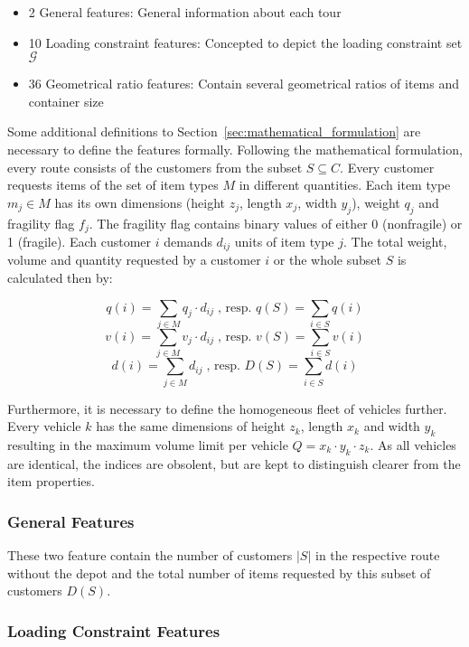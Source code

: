 \begin{itemize}
    \item 2 General features: General information about each tour
    \item 10 Loading constraint features: Concepted to depict the loading constraint set $\mathcal{G}$
    \item 36 Geometrical ratio features: Contain several geometrical ratios of items and container size
\end{itemize}

Some additional definitions to Section~\ref{sec:mathematical_formulation}
are necessary to define the features formally. Following the mathematical formulation, every route consists of the customers
from the subset $S \subseteq C$. Every customer requests items of the set of item types $M$ in different quantities.
Each item type $m_j\in M$ has its own dimensions (height $z_j$, length $x_j$, width $y_j$), weight $q_j$ and fragility flag $f_j$.
The fragility flag contains binary values of either 0 (nonfragile) or 1 (fragile).
Each customer $i$ demands $d_{ij}$ units of item type $j$.
The total weight, volume and quantity requested by a customer $i$ or the whole subset $S$ is calculated then by:

\[q(i) = \sum_{j \in M} q_j \cdot d_{ij}\;\text{, resp. } q(S) = \sum_{i\in S} q(i)\]
\[v(i) = \sum_{j \in M} v_j \cdot d_{ij}\;\text{, resp. } v(S) = \sum_{i\in S} v(i)\]
\[d(i) = \sum_{j \in M} d_{ij}\;\text{, resp. } D(S) = \sum_{i\in S} d(i)\]

Furthermore, it is necessary to define the homogeneous fleet of vehicles
further. Every vehicle $k$ has the same dimensions of height $z_k$, length $x_k$ and width $y_k$ resulting in the maximum volume limit per
vehicle $Q = x_k \cdot y_k\cdot z_k$. As all vehicles are identical, the indices are obsolent, but are kept to distinguish clearer
from the item properties.

\subsubsection{General Features}
These two feature contain the number of customers $|S|$ in the respective route without the depot and the total number of items requested by
this subset of customers $D(S)$.

\subsubsection{Loading Constraint Features}

